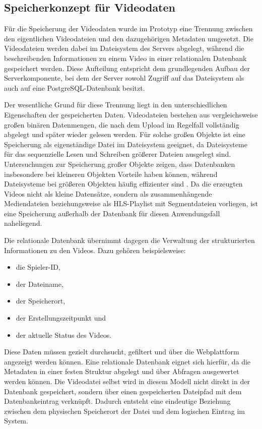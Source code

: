 \subsection{Speicherkonzept für Videodaten} 

Für die Speicherung der Videodaten wurde im Prototyp eine Trennung zwischen den eigentlichen Videodateien und den dazugehörigen Metadaten umgesetzt. Die Videodateien werden dabei im Dateisystem des Servers abgelegt, während die beschreibenden Informationen zu einem Video 
in einer relationalen Datenbank gespeichert werden. Diese Aufteilung entspricht dem grundlegenden Aufbau der Serverkomponente, bei dem der Server sowohl Zugriff auf das Dateisystem als auch auf eine PostgreSQL-Datenbank besitzt. 

Der wesentliche Grund für diese Trennung liegt in den unterschiedlichen Eigenschaften der gespeicherten Daten. Videodateien bestehen aus vergleichsweise großen binären Datenmengen, die nach dem Upload im Regelfall vollständig abgelegt und später wieder gelesen werden. 
Für solche großen Objekte ist eine Speicherung als eigenständige Datei im Dateisystem geeignet, da Dateisysteme für das sequenzielle Lesen und Schreiben größerer Dateien ausgelegt sind. Untersuchungen zur Speicherung großer Objekte zeigen, 
dass Datenbanken insbesondere bei kleineren Objekten Vorteile haben können, während Dateisysteme bei größeren Objekten häufig effizienter sind \cite{sears_van_ingen_gray_2006}. Da die erzeugten Videos nicht als kleine Datensätze, 
sondern als zusammenhängende Mediendateien beziehungsweise als HLS-Playlist mit Segmentdateien vorliegen, ist eine Speicherung außerhalb der Datenbank für diesen Anwendungsfall naheliegend. 

Die relationale Datenbank übernimmt dagegen die Verwaltung der strukturierten Informationen zu den Videos. Dazu gehören beispielsweise: 

\begin{itemize} 
    \item die Spieler-ID, 
    \item der Dateiname, 
    \item der Speicherort, 
    \item der Erstellungszeitpunkt und 
    \item der aktuelle Status des Videos. 
\end{itemize} 

Diese Daten müssen gezielt durchsucht, gefiltert und über die Webplattform angezeigt werden können. Eine relationale Datenbank eignet sich hierfür, da die Metadaten in einer festen Struktur abgelegt und über Abfragen ausgewertet werden können. Die Videodatei selbst wird in diesem Modell nicht direkt in der Datenbank gespeichert, 
sondern über einen gespeicherten Dateipfad mit dem Datenbankeintrag verknüpft. Dadurch entsteht eine eindeutige Beziehung zwischen dem physischen Speicherort der Datei und dem logischen Eintrag im System. 

